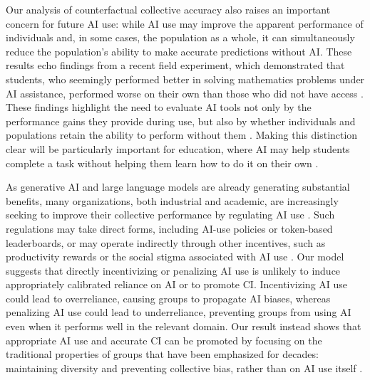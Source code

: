\documentclass[12pt]{article}
\begin{document}
Our analysis of counterfactual collective accuracy also raises an important concern for future AI use:
while AI use may improve the apparent performance of individuals and, in some cases, the population as a whole, it can simultaneously reduce the population’s ability to make accurate predictions without AI. 
These results echo findings from a recent field experiment, which demonstrated that students, who seemingly performed better in solving mathematics problems under AI assistance, performed worse on their own than those who did not have access \citep{bastani2025generative}.
These findings highlight the need to evaluate AI tools not only by the performance gains they provide during use, but also by whether individuals and populations retain the ability to perform without them \citep{melumad2025experimental,ke2026ai}.
Making this distinction clear will be particularly important for education, where AI may help students complete a task without helping them learn how to do it on their own \citep{bastani2025generative,melumad2025experimental}.

As generative AI and large language models are already generating substantial benefits, many organizations, both industrial and academic, are increasingly seeking to improve their collective performance by regulating AI use \citep{thorp2023chatgpt,bousquette2026tokenmaxxing,chawla2026researchers,keary2026cult}.
Such regulations may take direct forms, including AI-use policies or token-based leaderboards, or may operate indirectly through other incentives, such as productivity rewards or the social stigma associated with AI use \citep{reif2025evidence}.
Our model suggests that directly incentivizing or penalizing AI use is unlikely to induce appropriately calibrated reliance on AI or to promote CI.
Incentivizing AI use could lead to overreliance, causing groups to propagate AI biases, whereas penalizing AI use could lead to underreliance, preventing groups from using AI even when it performs well in the relevant domain.
Our result instead shows that appropriate AI use and accurate CI can be promoted by focusing on the traditional properties of groups that have been emphasized for decades:
maintaining diversity and preventing collective bias, rather than on AI use itself \citep{hong2004groups,lorenz2011social,mann2017optimal}.
\end{document}
